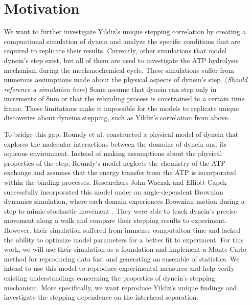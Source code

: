 \section{Motivation}

We want to further investigate Yildiz's unique stepping correlation by creating a compuational simulation of dynein and analyze the specific conditions that are required to replicate their results. Currently, other simulations that model dynein's step exist, but all of them are used to investigate the ATP hydrolysis mechanism during the mechanochemical cycle. These simulations suffer from numerous assumptions made about the physical aspects of dynein's step. (\textit{Should reference a simulation here}) Some assume that dynein can step only in increments of 8nm or that the rebinding process is constrained to a certain time frame. These limitations make it impossible for the models to replicate unique discoveries about dyneins stepping, such as Yildiz's correlation from above.

To bridge this gap, Roundy et al. constructed a physical model of dynein that explores the molecular interactions between the domains of dynein and its aqueous environment. Instead of making assumptions about the physical properties of the step, Roundy's model neglects the chemistry of the ATP exchange and assumes that the energy transfer from the ATP is incorporated within the binding processes. Researchers John Waczak and Elliott Capek successfully incorporated this model under an angle-dependent Brownian dynamics simulation, where each domain experiences Brownian motion during a step to mimic stochastic movement \cite{Capek2017, }. They were able to track dynein's precise movement along a walk and compare their stepping results to experiment. However, their simulation suffered from immense computaiton time and lacked the ability to optimize model parameters for a better fit to experiment. For this work, we will use their simulation as a foundation and implement a Monte Carlo method for reproducing data fast and generating an ensemble of statistics. We intend to use this model to reproduce experimental measures and help verify existing understandings concerning the properties of dynein’s stepping mechanism. More specifically, we want reproduce Yildiz's unique findings and investigate the stepping dependence on the interhead separation. 



